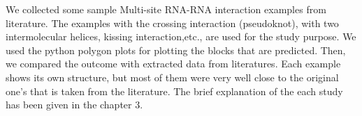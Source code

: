 \documentclass[twoside,a4paper]{report}
\numberwithin{equation}{section}
\begin{document}
	  We collected some sample Multi-site RNA-RNA interaction examples from literature. The examples with the crossing interaction (pseudoknot), with two intermolecular helices, kissing interaction,etc., are used for the study purpose. We used the python polygon plots for plotting the blocks that are predicted. Then, we compared the outcome with extracted data from literatures. Each example shows its own structure, but most of them were very well close to the original one's that is taken from the literature. The brief explanation of the each study has been given in the chapter 3. \\ 
	  
	  
	
	
	
	
	
	
\end{document}
